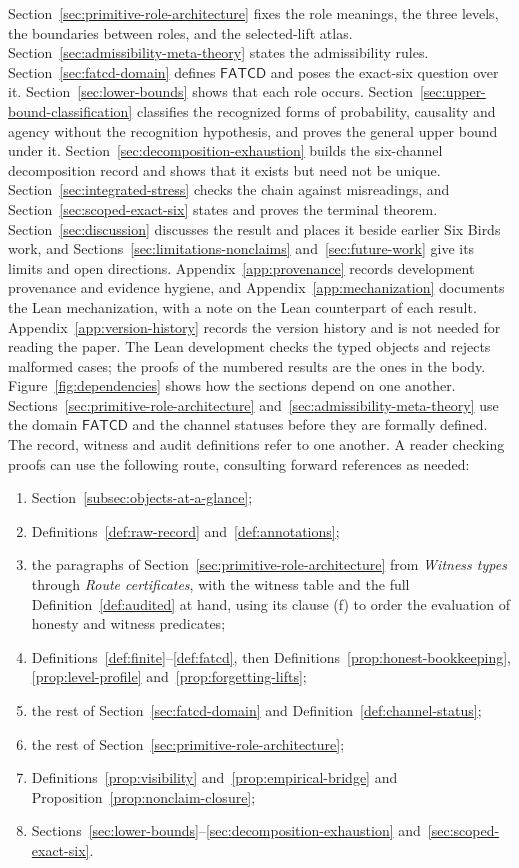 \documentclass[11pt]{article}
\theoremstyle{definition}
\newcommand{\FATCD}{\ensuremath{\mathsf{FATCD}}}
\begin{document}
Section~\ref{sec:primitive-role-architecture} fixes the role meanings,
the three levels, the boundaries between roles, and the selected-lift
atlas. Section~\ref{sec:admissibility-meta-theory} states the
admissibility rules. Section~\ref{sec:fatcd-domain} defines \FATCD{} and
poses the exact-six question over it. Section~\ref{sec:lower-bounds}
shows that each role occurs. Section~\ref{sec:upper-bound-classification}
classifies the recognized forms of probability, causality and agency
without the recognition hypothesis, and proves the general upper bound
under it.
Section~\ref{sec:decomposition-exhaustion} builds the six-channel
decomposition record and shows that it exists but need not be unique.
Section~\ref{sec:integrated-stress} checks the chain against misreadings,
and Section~\ref{sec:scoped-exact-six} states and proves the terminal
theorem. Section~\ref{sec:discussion} discusses the result and places it
beside earlier Six Birds work, and Sections~\ref{sec:limitations-nonclaims}
and~\ref{sec:future-work} give its limits and open directions. Appendix~\ref{app:provenance} records development provenance and
evidence hygiene, and Appendix~\ref{app:mechanization} documents the
Lean mechanization, with a note on the Lean counterpart of each result. Appendix~\ref{app:version-history} records the version history and is not needed for reading the paper. The Lean development checks the typed objects and rejects
malformed cases; the proofs of the numbered results are the ones in the body.
Figure~\ref{fig:dependencies} shows how the sections depend on one another.
Sections~\ref{sec:primitive-role-architecture}
and~\ref{sec:admissibility-meta-theory} use the domain \FATCD{} and the
channel statuses before they are formally defined. The record, witness and audit definitions refer to one another. A reader
checking proofs can use the following route, consulting forward references
as needed:
\begin{enumerate}[label=(\arabic*),topsep=2pt,itemsep=1pt]
  \item Section~\ref{subsec:objects-at-a-glance};
  \item Definitions~\ref{def:raw-record} and~\ref{def:annotations};
  \item the paragraphs of Section~\ref{sec:primitive-role-architecture} from
    \emph{Witness types} through \emph{Route certificates}, with the witness
    table and the full Definition~\ref{def:audited} at hand, using its clause
    (f) to order the evaluation of honesty and witness predicates;
  \item Definitions~\ref{def:finite}--\ref{def:fatcd}, then
    Definitions~\ref{prop:honest-bookkeeping}, \ref{prop:level-profile}
    and~\ref{prop:forgetting-lifts};
  \item the rest of Section~\ref{sec:fatcd-domain} and
    Definition~\ref{def:channel-status};
  \item the rest of Section~\ref{sec:primitive-role-architecture};
  \item Definitions~\ref{prop:visibility} and~\ref{prop:empirical-bridge} and
    Proposition~\ref{prop:nonclaim-closure};
  \item Sections~\ref{sec:lower-bounds}--\ref{sec:decomposition-exhaustion}
    and~\ref{sec:scoped-exact-six}.
\end{enumerate}
\end{document}
